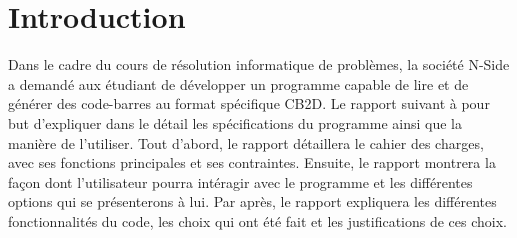 
\section{Introduction}

Dans le cadre du cours de résolution informatique de problèmes, la société N-Side a demandé aux étudiant de développer un programme capable de lire et de générer des code-barres au format spécifique CB2D. Le rapport suivant à pour but d'expliquer dans le détail les spécifications du programme ainsi que la manière de l'utiliser. Tout d'abord, le rapport détaillera le cahier des charges, avec ses fonctions principales et ses contraintes. Ensuite, le rapport montrera la façon dont l'utilisateur pourra intéragir avec le programme et les différentes options qui se présenterons à lui. Par après, le rapport expliquera les différentes fonctionnalités du code, les choix qui ont été fait et les justifications de ces choix. 

